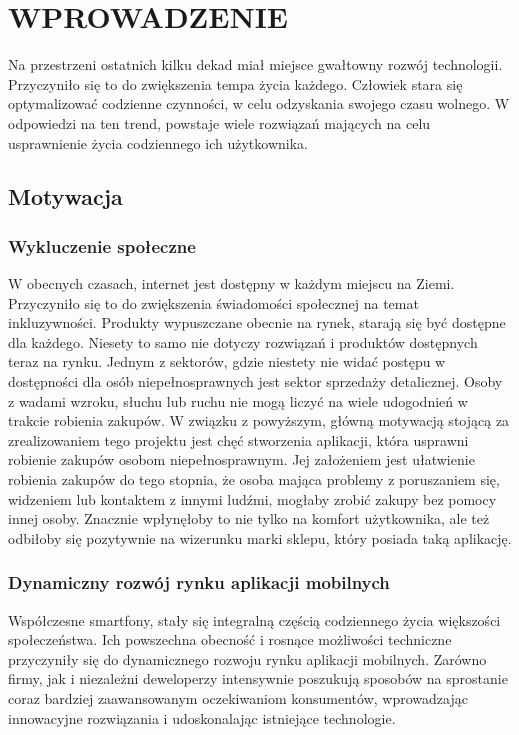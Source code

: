 \chapter{WPROWADZENIE}
\label{chapter:wprowadzenie}

Na przestrzeni ostatnich kilku dekad miał miejsce gwałtowny rozwój technologii. Przyczyniło się to do zwiększenia tempa życia każdego. Człowiek stara się optymalizować codzienne czynności, w celu odzyskania swojego czasu wolnego. W odpowiedzi na ten trend, powstaje wiele rozwiązań mających na celu usprawnienie życia codziennego ich użytkownika. 

\section{Motywacja}

\subsection{Wykluczenie społeczne}

W obecnych czasach, internet jest dostępny w każdym miejscu na Ziemi. Przyczyniło się to do zwiększenia świadomości społecznej na temat inkluzywności. Produkty wypuszczane obecnie na rynek, starają się być dostępne dla każdego. Niesety to samo nie dotyczy rozwiązań i produktów dostępnych teraz na rynku. Jednym z sektorów, gdzie niestety nie widać postępu w dostępności dla osób niepełnosprawnych jest sektor sprzedaży detalicznej. Osoby z wadami wzroku, słuchu lub ruchu nie mogą liczyć na wiele udogodnień w trakcie robienia zakupów.
W związku z powyższym, główną motywacją stojącą za zrealizowaniem tego projektu jest chęć stworzenia aplikacji, która usprawni robienie zakupów osobom niepełnosprawnym. Jej założeniem jest ułatwienie robienia zakupów do tego stopnia, że osoba mająca problemy z poruszaniem się, widzeniem lub kontaktem z innymi ludźmi, mogłaby zrobić zakupy bez pomocy innej osoby. Znacznie wpłynęłoby to nie tylko na komfort użytkownika, ale też odbiłoby się pozytywnie na wizerunku marki sklepu, który posiada taką aplikację.

\subsection{Dynamiczny rozwój rynku aplikacji mobilnych}

Współczesne smartfony, stały się integralną częścią codziennego życia większości społeczeństwa. Ich powszechna obecność i rosnące możliwości techniczne przyczyniły się do dynamicznego rozwoju rynku aplikacji mobilnych. Zarówno firmy, jak i niezależni deweloperzy intensywnie poszukują sposobów na sprostanie coraz bardziej zaawansowanym oczekiwaniom konsumentów, wprowadzając innowacyjne rozwiązania i udoskonalając istniejące technologie.

